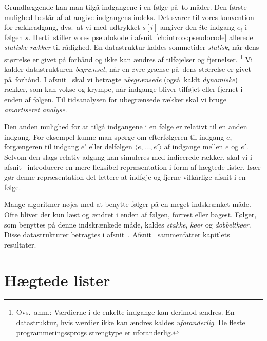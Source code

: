 Grundlæggende kan man tilgå indgangene i en følge på to måder.
Den første mulighed består af at angive indgangens indeks.
Det svarer til vores konvention for rækkeadgang,
dvs.\ at vi med udtrykket $s[i]$ angiver den $i$te indgang $e_i$ i følgen $s$.
Hertil stiller vores pseudokode i afsnit~\ref{ch:intro:s:pseudocode} allerede \emph{statiske rækker} til rådighed.
En datastruktur kaldes sommetider \emph{statisk}, 
når dens størrelse er givet på forhånd og ikke kan ændres af tilføjelser og fjernelser.%
\footnote{Ovs.\ anm.: Værdierne i de enkelte indgange kan derimod ændres.
En datastruktur, hvis værdier ikke kan ændres kaldes \emph{uforanderlig}.
De fleste programmeringssprogs strengtype er uforanderlig.
}
Vi kalder datastrukturen \emph{begrænset},
når en øvre grænse på dens størrelse er givet på forhånd.
I afsnit~ skal vi betragte \emph{ubegrænsede} (også kaldt \emph{dynamiske}) rækker,
som kan vokse og krympe, når indgange bliver tilføjet eller fjernet i enden af følgen.
Til tidsanalysen for ubegrænsede rækker skal vi bruge \emph{amortiseret analyse}.

Den anden mulighed for at tilgå indgangene i en følge er relativt til en anden indgang.
For eksempel kunne man spørge om efterfølgeren til indgang $e$,
forgængeren til indgang $e'$ 
eller delfølgen $\langle e,\ldots, e'\rangle$ af indgange mellen $e$ og $e'$.
Selvom den slags relativ adgang kan simuleres med indicerede rækker, skal vi i afsnit~ introducere en mere fleksibel repræsentation i form af hægtede lister.
Især gør denne repræsentation det lettere at indføje
og fjerne
vilkårlige afsnit i en følge.

Mange algoritmer nøjes med at benytte følger på en meget indskrænket måde.
Ofte bliver der kun læst og ændret i enden af følgen, forrest eller bagest.
Følger, som benyttes på denne indskrænkede måde, kaldes \emph{stakke}, \emph{køer} og \emph{dobbeltkøer}.
Disse datastrukturer betragtes i afsnit~.
Afsnit~ sammenfatter kapitlets resultater.

\section{Hægtede lister}

